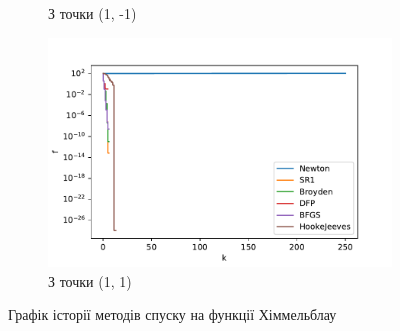 \begin{figure}[h!]
\begin{subfigure}{0.5\textwidth}
        \caption{З точки (1, -1)}
    \end{subfigure}
    \begin{subfigure}{0.5\textwidth}
        \includegraphics[width=\textwidth, trim=0cm 0cm 1.2cm 1cm, clip]{assets/descent_steps/himmelblau_steps_3.pdf}
        \caption{З точки (1, 1)}
    \end{subfigure}
    \caption{Графік історії методів спуску на функції Хіммельблау}
\end{figure}

